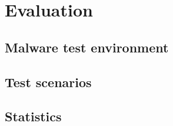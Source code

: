 \chapter{Evaluation}
\label{chapter:fifth-chapter}

\section{Malware test environment}
\label{fifth:test-env}

\section{Test scenarios}
\label{fifth:test-scenarios}

\section{Statistics}
\label{fifth:test-statistics}